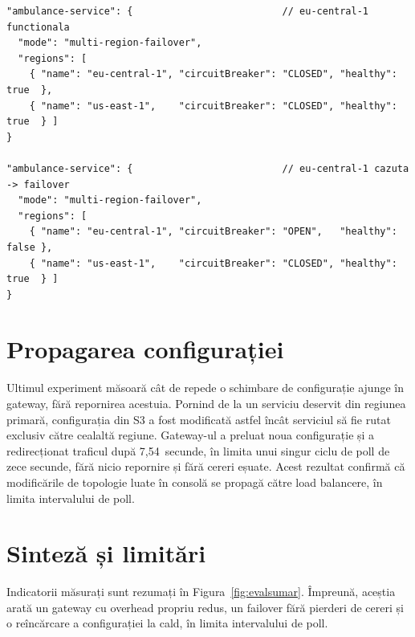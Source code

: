\documentclass[12pt,a4paper]{report}
\begin{document}
\begin{lstlisting}
"ambulance-service": {                          // eu-central-1 functionala
  "mode": "multi-region-failover",
  "regions": [
    { "name": "eu-central-1", "circuitBreaker": "CLOSED", "healthy": true  },
    { "name": "us-east-1",    "circuitBreaker": "CLOSED", "healthy": true  } ]
}

"ambulance-service": {                          // eu-central-1 cazuta -> failover
  "mode": "multi-region-failover",
  "regions": [
    { "name": "eu-central-1", "circuitBreaker": "OPEN",   "healthy": false },
    { "name": "us-east-1",    "circuitBreaker": "CLOSED", "healthy": true  } ]
}
\end{lstlisting}
\label{fig:sc-gwstatus}

\section{Propagarea configurației}
Ultimul experiment măsoară cât de repede o schimbare de configurație ajunge în gateway, fără repornirea acestuia. Pornind de la un serviciu deservit din regiunea primară, configurația din S3 a fost modificată astfel încât serviciul să fie rutat exclusiv către cealaltă regiune. Gateway-ul a preluat noua configurație și a redirecționat traficul după 7,54~secunde, în limita unui singur ciclu de poll de zece secunde, fără nicio repornire și fără cereri eșuate. Acest rezultat confirmă că modificările de topologie luate în consolă se propagă către load balancere, în limita intervalului de poll.

\section{Sinteză și limitări}
Indicatorii măsurați sunt rezumați în Figura~\ref{fig:evalsumar}. Împreună, aceștia arată un gateway cu overhead propriu redus, un failover fără pierderi de cereri și o reîncărcare a configurației la cald, în limita intervalului de poll.
\end{document}
